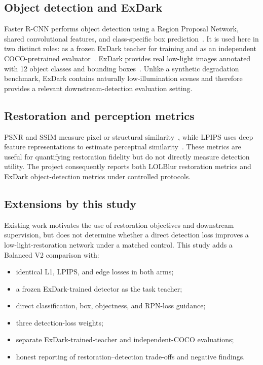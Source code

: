 \subsection{Object detection and ExDark}

Faster R-CNN performs object detection using a Region Proposal Network,
shared convolutional features, and class-specific box
prediction~\cite{ren2015fasterrcnn}. It is used here in two distinct roles:
as a frozen ExDark teacher for training and as an independent
COCO-pretrained evaluator~\cite{lin2014microsoft}. ExDark provides real low-light images annotated
with 12 object classes and bounding boxes~\cite{loh2019exdark}. Unlike a
synthetic degradation benchmark, ExDark contains naturally low-illumination
scenes and therefore provides a relevant downstream-detection evaluation
setting.

\subsection{Restoration and perception metrics}

PSNR and SSIM measure pixel or structural similarity~\cite{wang2004ssim},
while LPIPS uses deep feature representations to estimate perceptual
similarity~\cite{zhang2018lpips}. These metrics are useful for quantifying
restoration fidelity but do not directly measure detection utility. The
project consequently reports both LOLBlur restoration metrics and ExDark
object-detection metrics under controlled protocols.

\subsection{Extensions by this study}

Existing work motivates the use of restoration objectives and downstream
supervision, but does not determine whether a direct detection loss
improves a low-light-restoration network under a matched control. This
study adds a Balanced V2 comparison with:
\begin{itemize}
  \item identical L1, LPIPS, and edge losses in both arms;
  \item a frozen ExDark-trained detector as the task teacher;
  \item direct classification, box, objectness, and RPN-loss guidance;
  \item three detection-loss weights;
  \item separate ExDark-trained-teacher and independent-COCO evaluations;
  \item honest reporting of restoration--detection trade-offs and negative
  findings.
\end{itemize}

